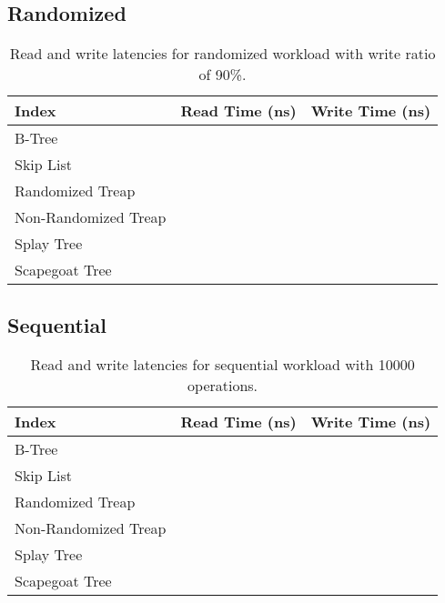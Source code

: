\documentclass[sigconf]{acmart}
\begin{document}
\subsection{Randomized}

\begin{center}
  \begin{table}[H]
    \begin{tabular}{| l | c | c |}
      \hline
      \bf{Index} & \bf{Read Time (ns)} & \bf{Write Time (ns)} \\
      \hline
      B-Tree & & \\
      \hline
      Skip List & & \\
      \hline
      Randomized Treap & & \\
      \hline
      Non-Randomized Treap & & \\
      \hline
      Splay Tree & & \\
      \hline
      Scapegoat Tree & & \\
      \hline
    \end{tabular}
    \caption{Read and write latencies for randomized workload with write ratio of 90\%.}
  \end{table}
\end{center}

\subsection{Sequential}
\begin{center}
  \begin{table}[H]
    \begin{tabular}{| l | c | c |}
      \hline
      \bf{Index} & \bf{Read Time (ns)} & \bf{Write Time (ns)} \\
      \hline
      B-Tree & & \\
      \hline
      Skip List & & \\
      \hline
      Randomized Treap & & \\
      \hline
      Non-Randomized Treap & & \\
      \hline
      Splay Tree & & \\
      \hline
      Scapegoat Tree & & \\
      \hline
    \end{tabular}
    \caption{Read and write latencies for sequential workload with 10000 operations.}
  \end{table}
\end{center}
\end{document}

